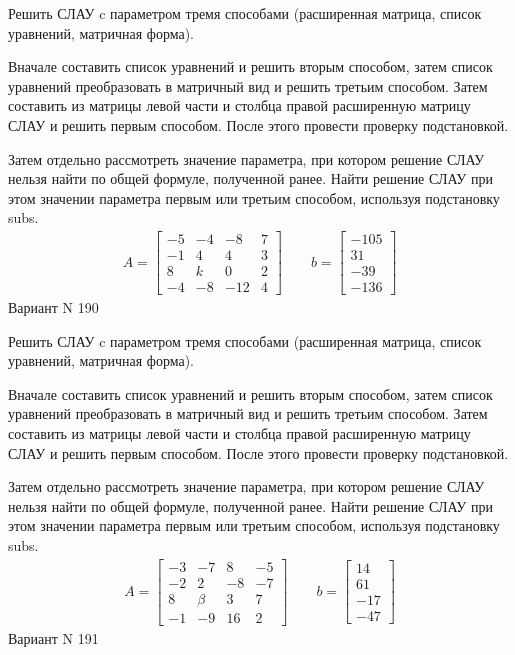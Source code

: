 \documentclass[11pt]{report}
\begin{document}
Решить СЛАУ c параметром тремя способами (расширенная матрица, список уравнений, матричная форма).

Вначале составить список уравнений и решить вторым способом,
затем список уравнений преобразовать в матричный вид и решить третьим способом.
Затем составить из матрицы левой части и столбца правой расширенную матрицу СЛАУ и решить первым способом.
После этого провести проверку подстановкой.

Затем отдельно рассмотреть значение параметра, при котором решение СЛАУ нельзя найти по общей формуле,
полученной ранее.
Найти решение СЛАУ при этом значении параметра первым или третьим способом, используя подстановку subs.
\begin{align*}
    A = \left[\begin{matrix}-5 & -4 & -8 & 7\\-1 & 4 & 4 & 3\\8 & k & 0 & 2\\-4 & -8 & -12 & 4\end{matrix}\right]
\qquad b = \left[\begin{matrix}-105\\31\\-39\\-136\end{matrix}\right]
\end{align*}
\newpage
Вариант N 190


Решить СЛАУ c параметром тремя способами (расширенная матрица, список уравнений, матричная форма).

Вначале составить список уравнений и решить вторым способом,
затем список уравнений преобразовать в матричный вид и решить третьим способом.
Затем составить из матрицы левой части и столбца правой расширенную матрицу СЛАУ и решить первым способом.
После этого провести проверку подстановкой.

Затем отдельно рассмотреть значение параметра, при котором решение СЛАУ нельзя найти по общей формуле,
полученной ранее.
Найти решение СЛАУ при этом значении параметра первым или третьим способом, используя подстановку subs.
\begin{align*}
    A = \left[\begin{matrix}-3 & -7 & 8 & -5\\-2 & 2 & -8 & -7\\8 & \beta & 3 & 7\\-1 & -9 & 16 & 2\end{matrix}\right]
\qquad b = \left[\begin{matrix}14\\61\\-17\\-47\end{matrix}\right]
\end{align*}
\newpage
Вариант N 191
\end{document}
